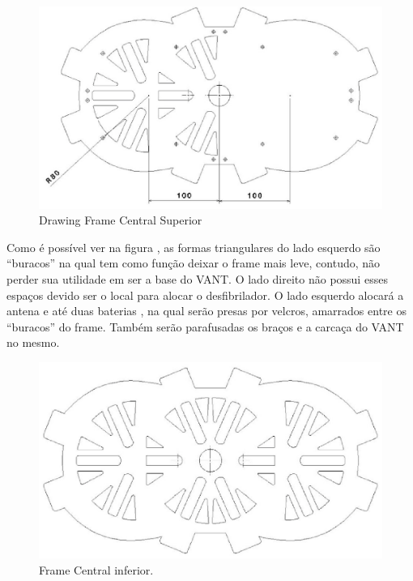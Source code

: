 \begin{figure}[H]
    \centering
      \includegraphics[keepaspectratio=true,scale=0.5]{figuras/drawing.eps}
    \caption{ Drawing Frame Central Superior}
    \label{fig:drawing}
\end{figure}

Como é possível ver na figura \label{fig:drawinfinfo}, as formas triangulares do lado esquerdo são “buracos” na qual tem como função deixar o frame mais leve, contudo, não perder sua utilidade em ser a base do VANT. O lado direito não possui esses espaços devido ser o local para alocar o desfibrilador. O lado esquerdo alocará a antena e até duas baterias , na qual serão presas por velcros, amarrados entre os “buracos” do frame. Também serão parafusadas os braços e a carcaça do VANT no mesmo.

\begin{figure}[H]
    \centering
      \includegraphics[keepaspectratio=true,scale=0.5]{figuras/drawinfinfo.eps}
    \caption{ Frame Central inferior.}
    \label{fig:drawinfinfo}
\end{figure}

